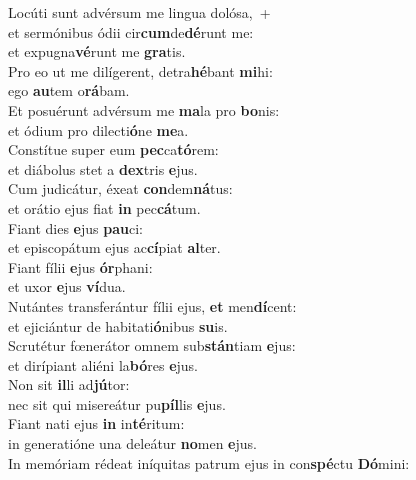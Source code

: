 \evenverse Locúti sunt advérsum me lingua dolósa,~+\\\evenverse  et sermónibus ódii cir\textbf{cum}de\textbf{dé}runt me:~\*\\
\evenverse et expugna\textbf{vé}runt me \textbf{gra}tis.\\
\oddverse Pro eo ut me dilígerent, detra\textbf{hé}bant \textbf{mi}hi:~\*\\
\oddverse ego \textbf{au}tem o\textbf{rá}bam.\\
\evenverse Et posuérunt advérsum me \textbf{ma}la pro \textbf{bo}nis:~\*\\
\evenverse et ódium pro dilecti\textbf{ó}ne \textbf{me}a.\\
\oddverse Constítue super eum \textbf{pec}ca\textbf{tó}rem:~\*\\
\oddverse et diábolus stet a \textbf{dex}tris \textbf{e}jus.\\
\evenverse Cum judicátur, éxeat \textbf{con}dem\textbf{ná}tus:~\*\\
\evenverse et orátio ejus fiat \textbf{in} pec\textbf{cá}tum.\\
\oddverse Fiant dies \textbf{e}jus \textbf{pau}ci:~\*\\
\oddverse et episcopátum ejus ac\textbf{cí}piat \textbf{al}ter.\\
\evenverse Fiant fílii \textbf{e}jus \textbf{ór}phani:~\*\\
\evenverse et uxor \textbf{e}jus \textbf{ví}dua.\\
\oddverse Nutántes transferántur fílii ejus, \textbf{et} men\textbf{dí}cent:~\*\\
\oddverse et ejiciántur de habitati\textbf{ó}nibus \textbf{su}is.\\
\evenverse Scrutétur fœnerátor omnem sub\textbf{stán}tiam \textbf{e}jus:~\*\\
\evenverse et dirípiant aliéni la\textbf{bó}res \textbf{e}jus.\\
\oddverse Non sit \textbf{il}li ad\textbf{jú}tor:~\*\\
\oddverse nec sit qui misereátur pu\textbf{píl}lis \textbf{e}jus.\\
\evenverse Fiant nati ejus \textbf{in} in\textbf{té}ritum:~\*\\
\evenverse in generatióne una deleátur \textbf{no}men \textbf{e}jus.\\
\oddverse In memóriam rédeat iníquitas patrum ejus in con\textbf{spé}ctu \textbf{Dó}mini:~\*\\

